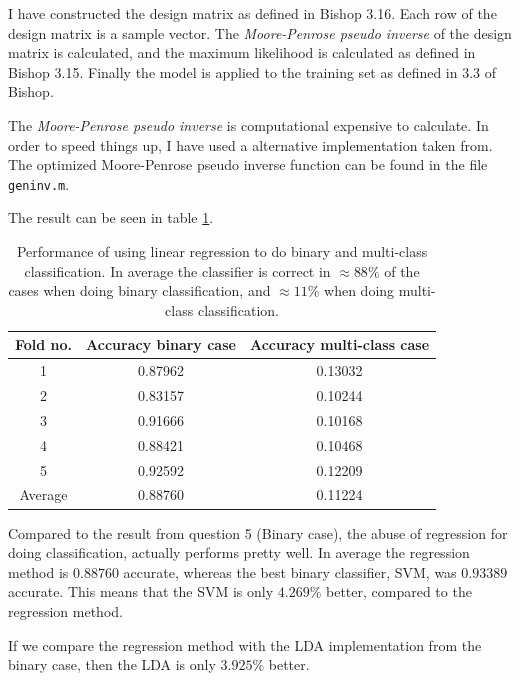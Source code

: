 \documentclass[10pt]{article}
\begin{document}
I have constructed the design matrix as defined in Bishop\cite{Bishop:2006:PRM:1162264} 3.16. Each row of the design matrix is a sample vector. The \emph{Moore-Penrose pseudo inverse} of the design matrix is calculated, and the maximum likelihood is calculated as defined in Bishop 3.15. Finally the model is applied to the training set as defined in 3.3 of Bishop. 

The \emph{Moore-Penrose pseudo inverse} is computational expensive to calculate. In order to speed things up, I have used a alternative implementation taken from\cite{DBLP:journals/corr/abs-0804-4809}. The optimized Moore-Penrose pseudo inverse function can be found in the file \texttt{geninv.m}.

The result can be seen in table \ref{table1}.

\begin{table}
  \begin{center}  
    \begin{tabular}{ | c | c | c |}
      \hline
      Fold no. & Accuracy binary case & Accuracy multi-class case\\
      \hline
      1       &  0.87962  &  0.13032\\
      2       &  0.83157  &  0.10244\\
      3       &  0.91666  &  0.10168\\
      4       &  0.88421  &  0.10468\\
      5       &  0.92592  &  0.12209\\
      \hline
      Average &  0.88760  &  0.11224\\
      \hline      
    \end{tabular}
    \caption{Performance of using linear regression to do binary and multi-class classification. In average the classifier is correct in $\approx 88\%$ of the cases when doing binary classification, and $\approx 11\%$ when doing multi-class classification.}
    \label{table1}
  \end{center}    
\end{table}   
                                       
Compared to the result from question 5 (Binary case), the abuse of regression for doing classification, actually performs pretty well. In average the regression method is $0.88760$ accurate, whereas the best binary classifier, SVM, was $0.93389$ accurate. This means that the SVM is only $4.269\%$ better, compared to the regression method.

If we compare the regression method with the LDA implementation from the binary case, then the LDA is only $3.925\%$ better.
\end{document}
